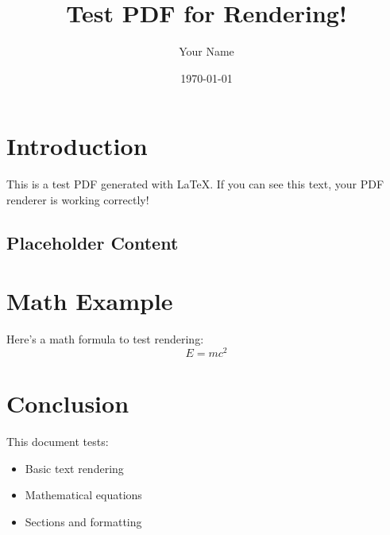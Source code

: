 \documentclass{article}
\title{Test PDF for Rendering!}
\author{Your Name}
\date{\today}
\begin{document}
\maketitle

\section{Introduction}
This is a test PDF generated with LaTeX. If you can see this text, your PDF renderer is working correctly!

\subsection{Placeholder Content}
\lipsum[1-2] %

\section{Math Example}
Here's a math formula to test rendering:
\[
E = mc^2
\]

\section{Conclusion}
This document tests:
\begin{itemize}
    \item Basic text rendering
    \item Mathematical equations
    \item Sections and formatting
\end{itemize}
\end{document}
